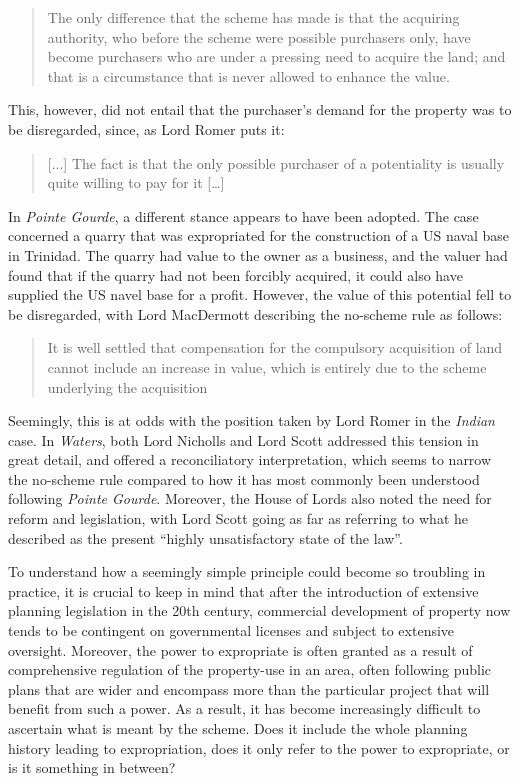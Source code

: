 \begin{quote}
The only difference that the scheme has made is that the acquiring
authority, who before the scheme were possible purchasers only, have
become purchasers who are under a pressing need to acquire the
land; and that is a circumstance that is never allowed to enhance the
value.
\end{quote}

This, however, did not entail that the purchaser's demand for the property was to be disregarded, since, as Lord Romer puts it:

\begin{quote}
[...] The fact is that the only possible purchaser of a potentiality is
usually quite willing to pay for it […]
\end{quote}

In \emph{Pointe Gourde}, a different stance appears to have been adopted. The case concerned a quarry that was expropriated for the construction of a US naval base in Trinidad. The quarry had value to the owner as a business, and the valuer had found that if the quarry had not been forcibly acquired, it could also have supplied the US navel base for a profit. However, the value of this potential fell to be disregarded, with Lord MacDermott describing the no-scheme rule as follows:

\begin{quote}
It is well settled that compensation for the compulsory acquisition of
land cannot include an increase in value, which is entirely due to the
scheme underlying the acquisition
\end{quote}

Seemingly, this is at odds with the position taken by Lord Romer in the {\it Indian} case. In \emph{Waters}, both Lord Nicholls and Lord Scott addressed this tension in great detail, and offered a reconciliatory interpretation, which seems to narrow the no-scheme rule compared to how it has most commonly been understood following \emph{Pointe Gourde}. Moreover, the House of Lords also noted the need for reform and legislation, with Lord Scott going as far as referring to what he described as the present ``highly unsatisfactory state of the law''.

To understand how a seemingly simple principle could become so troubling in practice, it is crucial to keep in mind that after the introduction of extensive planning legislation in the 20th century, commercial development of property now tends to be contingent on governmental licenses and subject to extensive oversight. Moreover, the power to expropriate is often granted as a result of comprehensive regulation of the property-use in an area, often following public plans that are wider and encompass more than the particular project that will benefit from such a power. As a result, it has become increasingly difficult to ascertain what is meant by the scheme. Does it include the whole planning history leading to expropriation, does it only refer to the power to expropriate, or is it something in between?

